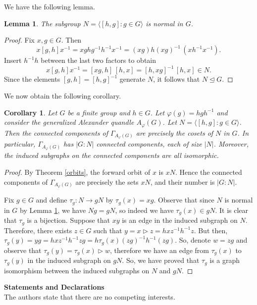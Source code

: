 \documentclass[english,11pt]{amsart}
\newtheorem{Lemma}[Theorem]{Lemma}
\newtheorem{Corollary}[Theorem]{Corollary}
\begin{document}
We have the following lemma.

\begin{Lemma}
\label{normal}
The subgroup $N=\langle [h,g] : g\in G\rangle$ is normal in $G$.
\end{Lemma}
\begin{proof}
 Fix $x,g\in G$. Then
\[
x[g,h]x^{-1}=xghg^{-1}h^{-1}x^{-1}=(xg)h(xg)^{-1}\,(xh^{-1}x^{-1}).
\]
Insert $h^{-1}h$ between the last two factors to obtain
\[
x[g,h]x^{-1}=[xg,h] \, [h,x]=[h,xg]^{-1} \, [h,x] \in N.
\]
Since the elements $[g,h]=[h,g]^{-1}$ generate $N$, it follows that
$N\trianglelefteq G$.
\end{proof}

We now obtain the following corollary.

\begin{Corollary}
Let $G$ be a finite group and $h\in G$. Let $\varphi(g)=hgh^{-1}$ and consider the generalized Alexander quandle $A_\varphi(G)$. Let $N=\langle [h,g] : g\in G\rangle$.
Then the connected components of $\Gamma_{A_\varphi(G)}$ are precisely the cosets of $N$ in $G$. In particular, $\Gamma_{A_\varphi(G)}$ has $|G:N|$ connected components, each of size $|N|$.
Moreover, the induced subgraphs on the connected components are all isomorphic.
\end{Corollary}

\begin{proof}
By Theorem \ref{orbits}, the forward orbit of $x$ is $xN$.  Hence the connected components of $\Gamma_{A_\varphi(G)}$ are precisely the sets $xN$, and their number is $|G:N|$.

Fix $g\in G$ and define $\tau_g:N\to gN$ by $\tau_g(x)=xg$. Observe that since $N$ is normal in $G$ by Lemma \ref{normal}, we have $Ng=gN$, so indeed we have $\tau_g(x) \in gN$. It is clear that $\tau_g$ is a bijection.
Suppose that $xy$ is an edge in the induced subgraph on $N$. Therefore, there exists $z \in G$ such that $y=x \rhd z=hxz^{-1}h^{-1}z$. But then, $\tau_g(y)=yg=hxz^{-1}h^{-1}zg=h\tau_g(x)(zg)^{-1}h^{-1}(zg)$. So, denote $w=zg$ and observe that $\tau_g(y)=\tau_g(x) \rhd w$, therefore we have an edge from $\tau_g(x)$ to $\tau_g(y)$ in the induced subgraph on $gN$. 
So, we have proved that $\tau_g$ is a graph isomorphism between the induced subgraphs on $N$ and $gN$.
\end{proof}

\bigskip

{\bf Statements and Declarations} \\

The authors state that there are no competing interests. 

\bigskip

\bigskip





\bigskip
\end{document}
